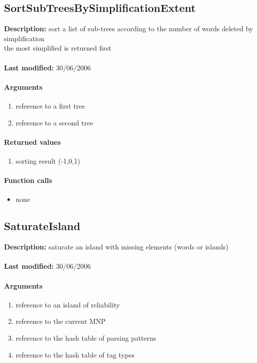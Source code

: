 \subsection{SortSubTreesBySimplificationExtent}
\textbf{Description:} sort a list of sub-trees according to the number of words deleted by simplification\\
the most simplified is returned first\\
\\\textbf{Last modified:} 30/06/2006

\paragraph{Arguments}
\begin{enumerate}
\item reference to a first tree
\item reference to a second tree
\end{enumerate}

\paragraph{Returned values}
\begin{enumerate}
\item sorting result (-1,0,1)
\end{enumerate}

\paragraph{Function calls}
\begin{itemize}
\item none
\end{itemize}

\subsection{SaturateIsland}
\textbf{Description:} saturate an island with missing elements (words or islands)\\
\\\textbf{Last modified:} 30/06/2006

\paragraph{Arguments}
\begin{enumerate}
\item reference to an island of reliability
\item reference to the current MNP
\item reference to the hash table of parsing patterns
\item reference to the hash table of tag types
\end{enumerate}

